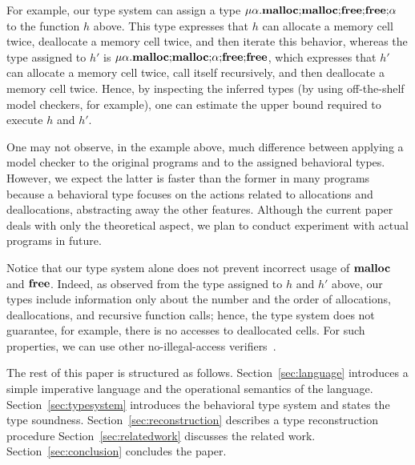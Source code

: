 For example, our type system can assign a type
\(\mu\alpha.\mathbf{malloc};\!\mathbf{malloc};\!\mathbf{free};\!\mathbf{free};\!\alpha\) to
the function \(h\) above.  This type expresses that \(h\) can allocate
a memory cell twice, deallocate a memory cell twice, and then iterate
this behavior, whereas the type assigned to \(h'\) is
\(\mu\alpha.\mathbf{malloc};\!\mathbf{malloc};\!\alpha;\!\mathbf{free};\!\mathbf{free}\),
which expresses that \(h'\) can allocate a memory cell twice, call
itself recursively, and then deallocate a memory cell twice.  Hence,
by inspecting the inferred types (by using off-the-shelf model
checkers, for example), one can estimate the upper bound required to
execute \(h\) and \(h'\).


One may not observe, in the example above, much difference between
applying a model checker to the original programs and to the assigned
behavioral types.  However, we expect the latter is faster than the
former in many programs because a behavioral type focuses on the
actions related to allocations and deallocations, abstracting away the
other features.  Although the current paper deals with only the
theoretical aspect, we plan to conduct experiment with actual programs
in future.

Notice that our type system alone does not prevent incorrect usage of
\(\mathbf{malloc}\) and \(\mathbf{free}\).  Indeed, as observed from the type assigned
to \(h\) and \(h'\) above, our types include information only about
the number and the order of allocations, deallocations, and recursive
function calls; hence, the type system does not guarantee, for
example, there is no accesses to deallocated cells.  For such
properties, we can use other no-illegal-access verifiers~\cite{DBLP:conf/aplas/SuenagaK09}.

The rest of this paper is structured as
follows. Section~\ref{sec:language} introduces a simple imperative
language and the operational semantics of the
language. Section~\ref{sec:typesystem} introduces the behavioral type
system and states the type soundness. Section~\ref{sec:reconstruction}
describes a type reconstruction procedure
Section~\ref{sec:relatedwork} discusses the related
work. Section~\ref{sec:conclusion} concludes the paper.

